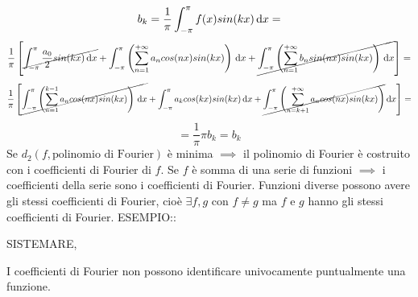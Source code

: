 \[b_k=\frac{1}{\pi}\int_{-\pi}^{\pi}f(x)sin(kx)\,\mathrm{d}{x}=\]
\[\frac{1}{\pi}\left[
\cancel{\int_{-\pi}^{\pi}\frac{a_0}{2}sin(kx)\,\mathrm{d}{x}}+
\int_{-\pi}^{\pi}\left(\sum\limits_{n=1}^{+\infty}a_ncos(nx)sin(kx)\right)\,\mathrm{d}{x}+
\cancel{\int_{-\pi}^{\pi}\left(\sum\limits_{n=1}^{+\infty}b_nsin(nx)sin(kx)\right)\,\mathrm{d}{x}}
\right]=\]
\[\frac{1}{\pi}\left[
\cancel{\int_{-\pi}^{\pi}\left(\sum\limits_{n=1}^{k-1} a_ncos(nx)sin(kx)\right)\,\mathrm{d}{x}}+
\int_{-\pi}^{\pi}a_kcos(kx)sin(kx)\,\mathrm{d}{x}+
\cancel{\int_{-\pi}^{\pi}\left(\sum\limits_{n=k+1}^{+\infty}a_ncos(nx)sin(kx)\right)}\,\mathrm{d}{x}
\right]=\]
\[=\frac{1}{\pi}\pi b_k=b_k\]
\observation
Se $d_2(f,\text{polinomio di Fourier})$ \`{e} minima $\implies$ il polinomio di Fourier \`{e} costruito con i coefficienti di Fourier di $f$.
\observation
Se $f$ \`{e} somma di una serie di funzioni $\implies$ i coefficienti della serie sono i coefficienti di Fourier.
\observation
Funzioni diverse possono avere gli stessi coefficienti di Fourier, cio\`{e} $\exists f,g$ con $f\ne g$ ma $f$ e $g$  hanno gli stessi coefficienti di Fourier.
ESEMPIO::
\begin{center}
	SISTEMARE,
\end{center}
\observation
I coefficienti di Fourier non possono identificare univocamente puntualmente una funzione.
